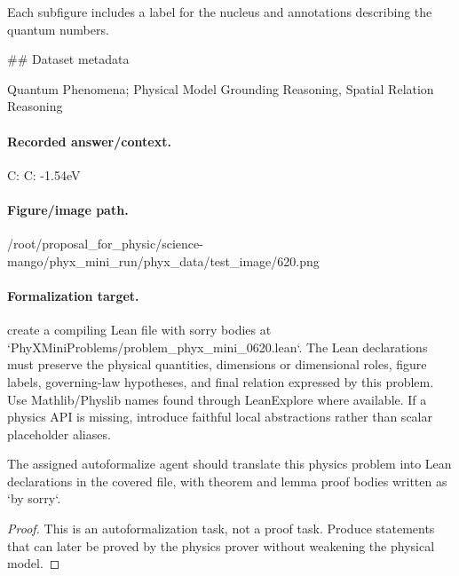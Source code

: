 Each subfigure includes a label for the nucleus and annotations describing the quantum numbers.

\#\# Dataset metadata

Quantum Phenomena; Physical Model Grounding Reasoning, Spatial Relation Reasoning

\paragraph{Recorded answer/context.}
C: C: -1.54eV

\paragraph{Figure/image path.}
/root/proposal\_for\_physic/science-mango/phyx\_mini\_run/phyx\_data/test\_image/620.png

\paragraph{Formalization target.}
create a compiling Lean file with sorry bodies at `PhyXMiniProblems/problem\_phyx\_mini\_0620.lean`. The Lean declarations must preserve the physical quantities, dimensions or dimensional roles, figure labels, governing-law hypotheses, and final relation expressed by this problem.
Use Mathlib/Physlib names found through LeanExplore where available. If a physics API is missing, introduce faithful local abstractions rather than scalar placeholder aliases.

\begin{theorem}
\label{thm:physics:phyx_mini_0620:target}
The assigned autoformalize agent should translate this physics problem into Lean declarations in the covered file, with theorem and lemma proof bodies written as `by sorry`.
\end{theorem}
\begin{proof}
This is an autoformalization task, not a proof task. Produce statements that can later be proved by the physics prover without weakening the physical model.
\end{proof}

